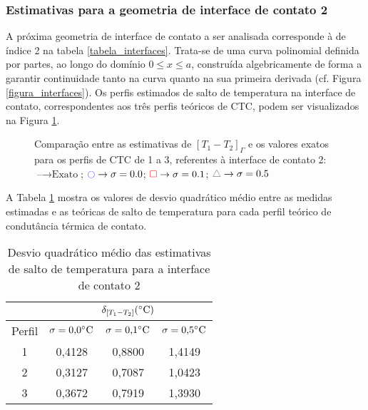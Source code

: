 \subsubsection{Estimativas para a geometria de interface de contato 2}

A próxima geometria de interface de contato a ser analisada corresponde à de índice 2 na tabela \ref{tabela_interfaces}. Trata-se de uma curva polinomial definida por partes, ao longo do domínio $0 \le x \le a$, construída algebricamente de forma a garantir continuidade tanto na curva quanto na sua primeira derivada (cf. Figura \ref{figura_interfaces}). Os perfis estimados de salto de temperatura na interface de contato, correspondentes aos três perfis teóricos de CTC, podem ser visualizados na Figura \ref{figura_delta_temperaturas_interface_02}.
\begin{figure}[H]
	\caption{Comparação entre as estimativas de $[T_1 - T_2]_\Gamma$ e os valores exatos para os perfis de CTC de 1 a 3, referentes à interface de contato 2: $\text{--} \rightarrow \text{Exato}$; $\textcolor{blue}{\ocircle} \rightarrow \sigma = 0.0$; $\textcolor{red}{\square} \rightarrow \sigma = 0.1$; $\textcolor{gray}{\triangle} \rightarrow \sigma = 0.5$}
	\label{figura_delta_temperaturas_interface_02}
\end{figure}

A Tabela \ref{tabela_rms_delta_temperaturas_interface_2} mostra os valores de desvio quadrático médio entre as medidas estimadas e as teóricas de salto de temperatura para cada perfil teórico de condutância térmica de contato.
\begin{table}[H]
	\centering
	\caption{Desvio quadrático médio das estimativas de salto de temperatura para a interface de contato 2}
	\begin{tabular}{c|c|c|c|}
		\cline{2-4}
		& \multicolumn{3}{c|}{$\delta_{[T_1 - T_2]} (\celsius)$} \\ \hline
		\multicolumn{1}{|c|}{Perfil} & $\sigma = \text{0,0}\celsius$   & $\sigma = \text{0,1}\celsius$    & $\sigma = \text{0,5}\celsius$  \\ \hline
		\multicolumn{1}{|c|}{1}      & 0,4128       & 0,8800       & 1,4149      \\ \hline
		\multicolumn{1}{|c|}{2}      & 0,3127       & 0,7087       & 1,0423      \\ \hline
		\multicolumn{1}{|c|}{3}      & 0,3672       & 0,7919       & 1,3930      \\ \hline
	\end{tabular}
	\label{tabela_rms_delta_temperaturas_interface_2}
\end{table}

